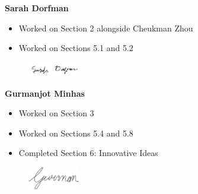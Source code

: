 \textbf{Sarah Dorfman}
\begin{itemize}
    \item Worked on Section 2 alongside Cheukman Zhou
    \item Worked on Sections 5.1 and 5.2
\end{itemize}
\begin{figure}[H]
	\centering
	\includegraphics[width=0.2\textwidth]{Signatures/s.png}
\end{figure}

\textbf{Gurmanjot Minhas}
\begin{itemize}
    \item Worked on Section 3
    \item Worked on Sections 5.4 and 5.8
    \item Completed Section 6: Innovative Ideas
\end{itemize}
\begin{figure}[H]
	\centering
	\includegraphics[width=0.2\textwidth]{Signatures/g.png}
\end{figure}

